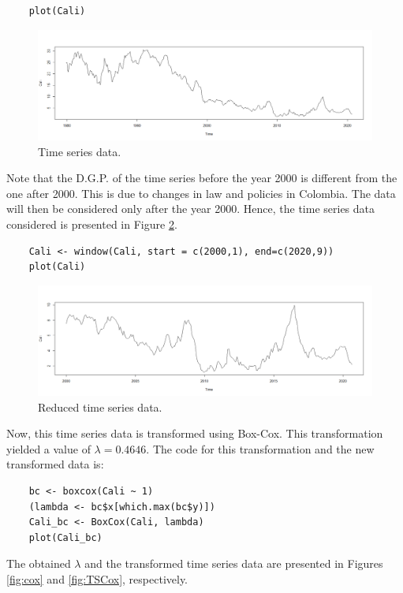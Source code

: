 \documentclass[fleqn]{article}
\begin{document}
\begin{enumerate}
    \begin{verbatim}
    plot(Cali)
    \end{verbatim}
    \begin{figure}[H]
        \centering
        \includegraphics[width=\linewidth]{figs/TSComplete.png}
        \caption{Time series data.}
        \label{fig:TSComplete}
    \end{figure}
    Note that the D.G.P. of the time series before the year 2000 is different from the one after 2000. This is due to changes in law and policies in Colombia. The data will then be considered only after the year 2000. Hence, the time series data considered is presented in Figure \ref{fig:TSCut}.
    \begin{verbatim}
    Cali <- window(Cali, start = c(2000,1), end=c(2020,9))
    plot(Cali)
    \end{verbatim}
    \begin{figure}[H]
        \centering
        \includegraphics[width=\linewidth]{figs/TSCut.png}
        \caption{Reduced time series data.}
        \label{fig:TSCut}
    \end{figure}
    Now, this time series data is transformed using Box-Cox. This transformation yielded a value of $\lambda=0.4646$. The code for this transformation and the new transformed data is:
    \begin{verbatim}
    bc <- boxcox(Cali ~ 1)
    (lambda <- bc$x[which.max(bc$y)])
    Cali_bc <- BoxCox(Cali, lambda)
    plot(Cali_bc)
    \end{verbatim}
    The obtained $\lambda$ and the transformed time series data are presented in Figures \ref{fig:cox} and \ref{fig:TSCox}, respectively.

\end{enumerate}
\end{document}
